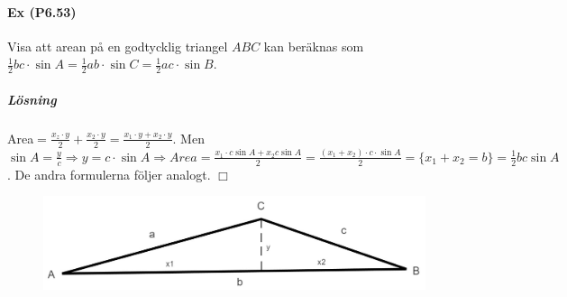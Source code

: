 \paragraph{Ex (P6.53)} Visa att arean på en godtycklig triangel $ABC$ kan beräknas som $\frac{1}{2}bc\cdot\sin A=\frac{1}{2}ab\cdot\sin C=\frac{1}{2}ac\cdot\sin B$.
\subparagraph{Lösning}
Area$=\frac{x_z\cdot y}{2}+\frac{x_2\cdot y}{2}=\frac{x_1\cdot y + x_2\cdot y}{2}$.
Men $\sin A=\frac{y}{c}\Rightarrow y=c\cdot\sin A \Rightarrow Area=\frac{x_1\cdot c\sin A+x_2c\sin A}{2}=\frac{(x_1+x_2)\cdot c\cdot\sin A}{2}=\{x_1+x_2=b\}=\frac{1}{2}bc\sin A$.
De andra formulerna följer analogt. $\Box$
\begin{figure}[h!]
    \centering
    \includegraphics[scale=0.2]{lessons/lesson02/imgs/img04.jpg}
\end{figure}